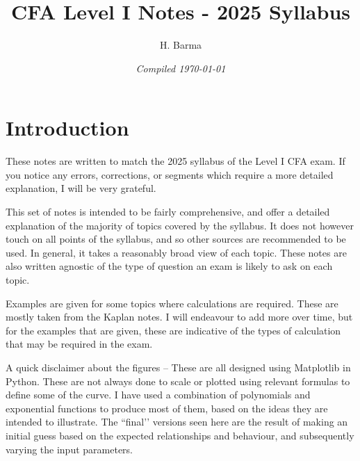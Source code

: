 \documentclass[11pt, a4paper]{article}
\numberwithin{equation}{section}
\numberwithin{figure}{section}
\numberwithin{table}{section}
\begin{document}
\begin{titlepage}
\vfill
\title{\textbf{CFA Level I Notes - 2025 Syllabus}}
\author{H. Barma}
 \date{\emph{Compiled \Datea\today}}
\maketitle
\thispagestyle{plain}
\thispagestyle{empty}
\vfill
\end{titlepage}
\clearpage



\clearpage

\section*{Introduction}
These notes are written to match the 2025 syllabus of the Level I CFA exam. If you notice any errors, corrections, or segments which require a more detailed explanation, I will be very grateful. \newline \par

This set of notes is intended to be fairly comprehensive, and offer a detailed explanation of the majority of topics covered by the syllabus. It does not however touch on all points of the syllabus, and so other sources are recommended to be used. In general, it takes a reasonably broad view of each topic. These notes are also written agnostic of the type of question an exam is likely to ask on each topic. \newline \par

Examples are given for some topics where calculations are required. These are mostly taken from the Kaplan notes. I will endeavour to add more over time, but for the examples that are given, these are indicative of the types of calculation that may be required in the exam. \newline \par

A quick disclaimer about the figures -- These are all designed using Matplotlib in Python. These are not always done to scale or plotted using relevant formulas to define some of the curve. I have used a combination of polynomials and exponential functions to produce most of them, based on the ideas they are intended to illustrate. The ``final’’ versions seen here are the result of making an initial guess based on the expected relationships and behaviour, and subsequently varying the input parameters.
\clearpage
\end{document}
